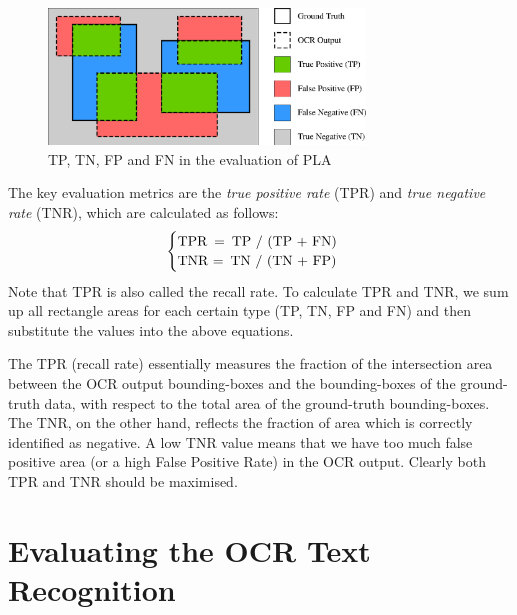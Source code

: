 \begin{figure}[!htb]
    \centering
    \includegraphics[width=0.75\textwidth]{eval-ocr-pla.eps}
    \caption{TP, TN, FP and FN in the evaluation of PLA}
    \label{fig:eval-ocr-pla}
\end{figure}

The key evaluation metrics are the \textit{true positive rate} (TPR) and \textit{true negative rate} (TNR), which are calculated as follows:
\[
    \begin{cases}
        \text{TPR \,=\, TP / (TP + FN)} \\
        \text{TNR =\, TN / (TN + FP)}
    \end{cases}
\]
Note that TPR is also called the recall rate. To calculate TPR and TNR, we sum up all rectangle areas for each certain type (TP, TN, FP and FN) and then substitute the values into the above equations.

The TPR (recall rate) essentially measures the fraction of the intersection area between the OCR output bounding-boxes and the bounding-boxes of the ground-truth data, with respect to the total area of the ground-truth bounding-boxes. The TNR, on the other hand, reflects the fraction of area which is correctly identified as negative. A low TNR value means that we have too much false positive area (or a high False Positive Rate) in the OCR output. Clearly both TPR and TNR should be maximised.


\section{Evaluating the OCR Text Recognition}

